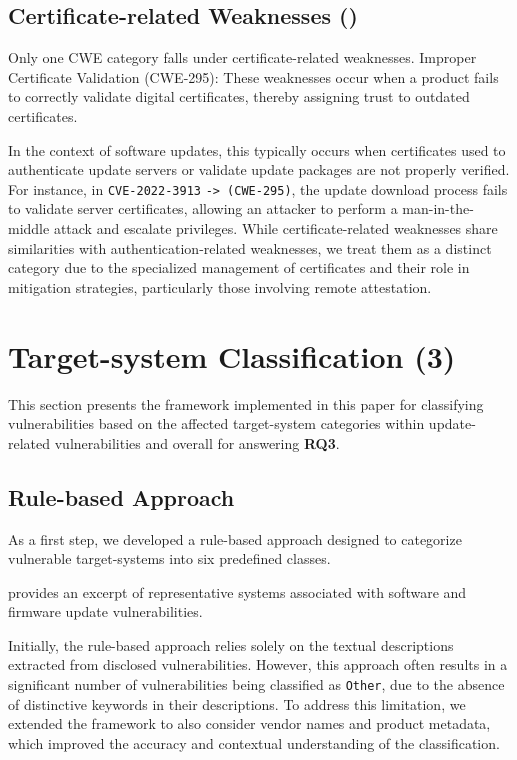 \documentclass[fleqn,s1,names,tex]{neptune}
\begin{document}
\subsection{Certificate-related \?Weaknesses ({})}

Only one CWE category falls under certificate-related weaknesses.
Improper Certificate Validation (CWE-295):
These weaknesses occur when a product fails to correctly validate digital certificates, thereby assigning trust to outdated certificates.

In the context of software updates, this typically occurs when certificates used to authenticate update servers or validate update packages are not properly verified. For instance, in \texttt{CVE-2022-3913} \texttt{-> (CWE-295)}, the update download process fails to validate server certificates, allowing an attacker to perform a man-in-the-middle attack and escalate privileges.
While certificate-related weaknesses share similarities with authentication-related weaknesses, we treat them as a distinct category due to the specialized management of certificates and their role in mitigation strategies, particularly those involving remote attestation.


\section{Target-system Classification ({}3)}



This section presents the framework implemented in this paper for classifying vulnerabilities based on the affected target-system categories within update-related vulnerabilities and overall for answering \textbf{RQ3}.


\subsection{Rule-based Approach }


As a first step, we developed a rule-based approach designed to categorize vulnerable target-systems into six predefined classes. 

 provides an excerpt of representative systems associated with software and firmware update vulnerabilities.


Initially, the rule-based approach relies solely on the textual descriptions extracted from disclosed vulnerabilities.
However, this approach often results in a significant number of vulnerabilities being classified as \texttt{Other}, due to the absence of distinctive keywords in their descriptions.
To address this limitation, we extended the framework to also consider vendor names and product metadata, which improved the accuracy and contextual understanding of the classification.
\end{document}
